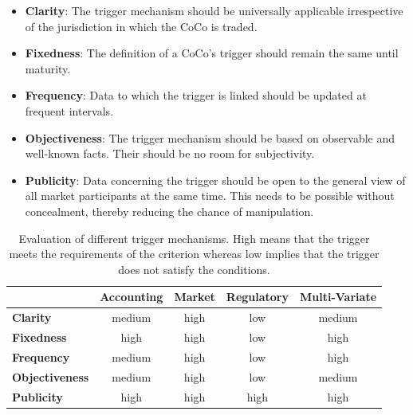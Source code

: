 \begin{itemize}
\renewcommand\labelitemi{--}
\item \textbf{Clarity}:  The trigger mechanism should be universally applicable irrespective of the jurisdiction in which the CoCo is traded.
\item \textbf{Fixedness}: The definition of a CoCo's trigger should remain the same until maturity.
\item \textbf{Frequency}: Data to which the trigger is linked should be updated at frequent intervals.
\item \textbf{Objectiveness}: The trigger mechanism should be based on observable and well-known facts. Their should be no room for subjectivity.
\item \textbf{Publicity}: Data concerning the trigger should be open to the general view of all market participants at the same time. This needs to be possible without concealment, thereby reducing the chance of manipulation.
\end{itemize}

\begin{table}[H]
	\setlength{\extrarowheight}{2.5pt}
	\centering
	\begin{tabular}{lcccc}
		\toprule
			 & \textbf{Accounting} & \textbf{Market} & \textbf{Regulatory} & \textbf{Multi-Variate} \\
		\midrule
			\textbf{Clarity} & \cellcolor{yellow!20} medium & \cellcolor{green!20} high & \cellcolor{red!20} low & \cellcolor{yellow!20} medium\\
			\textbf{Fixedness} & \cellcolor{green!20} high & \cellcolor{green!20} high & \cellcolor{red!20} low & \cellcolor{green!20} high \\
			\textbf{Frequency} & \cellcolor{yellow!20} medium & \cellcolor{green!20} high & \cellcolor{red!20} low & \cellcolor{green!20} high\\
			\textbf{Objectiveness} & \cellcolor{yellow!20} medium & \cellcolor{green!20} high & \cellcolor{red!20} low & \cellcolor{yellow!20} medium \\
			\textbf{Publicity} & \cellcolor{green!20} high & \cellcolor{green!20} high & \cellcolor{green!20} high & \cellcolor{green!20} high \\
		\bottomrule
	\end{tabular}
	\caption[Evaluation of different trigger mechanisms]{Evaluation of different trigger mechanisms. High means that the trigger meets the requirements of the criterion whereas low implies that the trigger does not satisfy the conditions. \citep{erismann2015pricing}}
	\label{table:evaluationtrigger}
\end{table}

